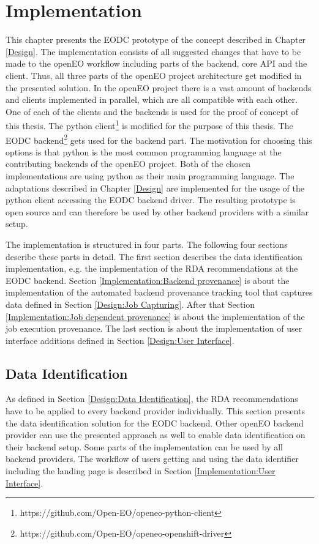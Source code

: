 \documentclass[draft,final]{vutinfth} %
\begin{document}
\chapter{Implementation}\label{Implementation}
This chapter presents the EODC prototype of the concept described in Chapter \ref{Design}. The implementation consists of all suggested changes that have to be made to the openEO workflow including parts of the backend, core API and the client. Thus, all three parts of the openEO project architecture get modified in the presented solution. In the openEO project there is a vast amount of backends and clients implemented in parallel, which are all compatible with each other. One of each of the clients and the backends is used for the proof of concept of this thesis. The python client\footnote{https://github.com/Open-EO/openeo-python-client} is modified for the purpose of this thesis. The EODC backend\footnote{https://github.com/Open-EO/openeo-openshift-driver} gets used for the backend part. The motivation for choosing this options is that python is the most common programming language at the contributing backends of the openEO project. Both of the chosen implementations are using python as their main programming language. The adaptations described in Chapter \ref{Design} are implemented for the usage of the python client accessing the EODC backend driver. The resulting prototype is open source and can therefore be used by other backend providers with a similar setup.  

The implementation is structured in four parts. The following four sections describe these parts in detail. The first section describes the data identification implementation, e.g. the implementation of the RDA recommendations at the EODC backend. Section \ref{Implementation:Backend provenance} is about the implementation of the automated backend provenance tracking tool that captures data defined in Section \ref{Design:Job Capturing}. After that Section \ref{Implementation:Job dependent provenance} is about the implementation of the job execution provenance. The last section is about the implementation of user interface additions defined in Section \ref{Design:User Interface}.     

\section{Data Identification}\label{Implementation:Data Identification}

As defined in Section \ref{Design:Data Identification}, the RDA recommendations have to be applied to every backend provider individually. This section presents the data identification solution for the EODC backend. Other openEO backend provider can use the presented approach as well to enable data identification on their backend setup. Some parts of the implementation can be used by all backend providers. The workflow of users getting and using the data identifier including the landing page is described in Section \ref{Implementation:User Interface}. \\
\end{document}
